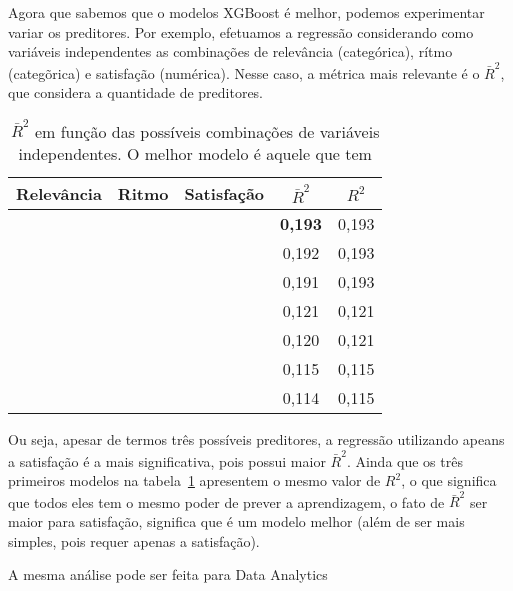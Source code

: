 Agora que sabemos que o modelos XGBoost é melhor, podemos experimentar variar os preditores.
Por exemplo, efetuamos a regressão considerando como variáveis independentes as combinações de relevância (categórica), rítmo (categõrica) e satisfação (numérica). Nesse caso, a métrica mais relevante é o $\bar R^2$, que considera a quantidade de preditores.

\begin{table}
	\centering
	\caption{$\bar R^2$ em função das possíveis combinações de variáveis independentes. O melhor modelo é aquele que tem }
	\label{tab:reg-ds-2}
	\begin{tabular}{ccccc}
		\toprule
		Relevância & Ritmo      & Satisfação & $\bar R^2$ & $R^2$\\
		\midrule
		           &            & \checkmark & \textbf{0,193} & 0,193\\
		\checkmark & \checkmark &            & 0,192          & 0,193\\
		\checkmark & \checkmark & \checkmark & 0,191          & 0,193\\
		           & \checkmark &            & 0,121          & 0,121\\
		           & \checkmark & \checkmark & 0,120          & 0,121\\
		\checkmark &            &            & 0,115          & 0,115\\
		\checkmark &            & \checkmark & 0,114          & 0,115\\
		\bottomrule
	\end{tabular}
\end{table}

Ou seja, apesar de termos três possíveis preditores, a regressão utilizando apeans a satisfação é a mais significativa, pois possui maior $\bar R^2$.
Ainda que os três primeiros modelos na tabela~\ref{tab:reg-ds-2} apresentem o mesmo valor de $R^2$, o que significa que todos eles tem o mesmo poder de prever a aprendizagem, o fato de $\bar R^2$ ser maior para satisfação, significa que é um modelo melhor (além de ser mais simples, pois requer apenas a satisfação).



A mesma análise pode ser feita para Data Analytics

